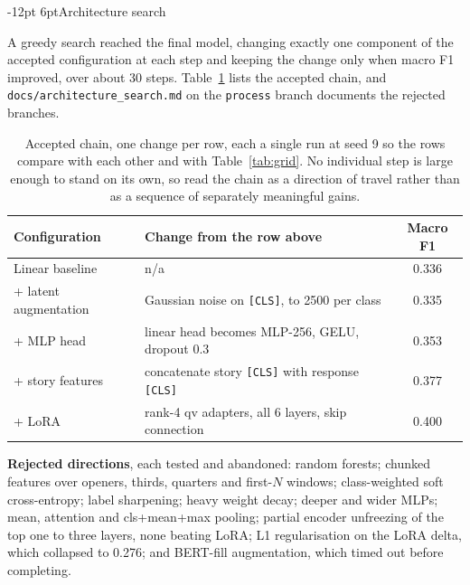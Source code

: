 \documentclass[11pt,a4paper]{article}
\makeatletter
\renewcommand\section{\@startsection{section}{1}{\z@}%
  {-12pt \@plus -3pt \@minus -2pt}{6pt}{\normalfont\large\bfseries}}
\makeatother
\begin{document}
\newpage
\appendix

\section{Architecture search}
\label{app:search}

A greedy search reached the final model, changing exactly one component of the accepted
configuration at each step and keeping the change only when macro F1 improved, over about
30 steps. Table~\ref{tab:chain} lists the accepted chain, and
\texttt{docs/architecture\_search.md} on the \texttt{process} branch documents the rejected
branches.

\begin{table}[h]
\centering
\small
\caption{Accepted chain, one change per row, each a single run at seed 9 so the rows compare
with each other and with Table~\ref{tab:grid}. No individual step is large enough to stand
on its own, so read the chain as a direction of travel rather than as a sequence of
separately meaningful gains.}
\label{tab:chain}
\begin{tabular}{@{}lp{7.6cm}c@{}}
\toprule
Configuration & Change from the row above & Macro F1 \\
\midrule
Linear baseline & n/a & 0.336 \\
+ latent augmentation & Gaussian noise on \texttt{[CLS]}, to 2500 per class & 0.335 \\
+ MLP head & linear head becomes MLP-256, GELU, dropout 0.3 & 0.353 \\
+ story features & concatenate story \texttt{[CLS]} with response \texttt{[CLS]} & 0.377 \\
+ LoRA & rank-4 qv adapters, all 6 layers, skip connection & 0.400 \\
\bottomrule
\end{tabular}
\end{table}

\textbf{Rejected directions}, each tested and abandoned: random forests; chunked features
over openers, thirds, quarters and first-$N$ windows; class-weighted soft cross-entropy;
label sharpening; heavy weight decay; deeper and wider MLPs; mean, attention and
cls+mean+max pooling; partial encoder unfreezing of the top one to three layers, none
beating LoRA; L1 regularisation on the LoRA delta, which collapsed to 0.276; and
BERT-fill augmentation, which timed out before completing.
\end{document}
